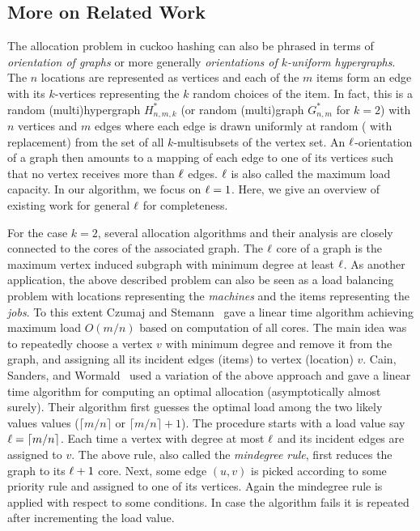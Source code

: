 \subsection{More on Related Work}
The allocation problem in cuckoo hashing can also be phrased in terms of \emph{orientation of graphs} or more generally \emph{orientations of $k$-uniform hypergraphs}. The $n$ locations are represented as vertices and each of the $m$ items form an edge with its $k$-vertices representing the $k$ random choices of the item.
In fact, this is a random (multi)hypergraph $H^*_{n,m,k}$ (or random (multi)graph $G^*_{n,m}$ for $k=2$) with $n$ vertices and $m$ edges where each edge is drawn uniformly at random ( with replacement) from the set of all $k$-multisubsets of the vertex set. An $\ell$-orientation of a graph then amounts to a mapping of each edge to one of its vertices such that no vertex receives more than $\ell$ edges. $\ell$ is also called the maximum load capacity. In our algorithm, we focus on $\ell=1$. Here, we give an overview of existing work for general $\ell$ for completeness.

For the case $k = 2$, several allocation algorithms and their analysis are closely connected to the cores of the associated
graph. The $\ell$ core of a graph is the maximum vertex induced subgraph with minimum degree at least $\ell$. As another application, the above described problem can also be seen as a load balancing problem with locations representing the \emph{machines} and the items representing the \emph{jobs}. To this extent Czumaj and Stemann~\cite{ina:cs01} gave a linear time algorithm achieving maximum load $O(m/n)$ based on computation of all cores. The main idea was to repeatedly choose a
vertex $v$ with minimum degree and remove it from the graph, and assigning all its incident edges (items) to vertex (location) $v$. Cain, Sanders, and Wormald~\cite{1283433}  used a variation of the above approach and gave a linear time algorithm for computing an optimal allocation (asymptotically almost surely). Their algorithm first guesses the optimal load among the two likely values values ($\lceil m/n\rceil $ or $\lceil m/n\rceil +1$). The procedure starts with a load value say $\ell=\lceil m/n\rceil $. Each time a vertex with degree at most $\ell$ and its incident edges are assigned to $v$. The above rule, also called the \emph{mindegree rule}, first reduces the graph to its $\ell+1$ core. Next, some edge $(u,v)$ is picked according to some priority rule and assigned to one of its vertices. Again the mindegree rule is applied with respect to some conditions. In case the algorithm fails it is repeated after incrementing the load value.

